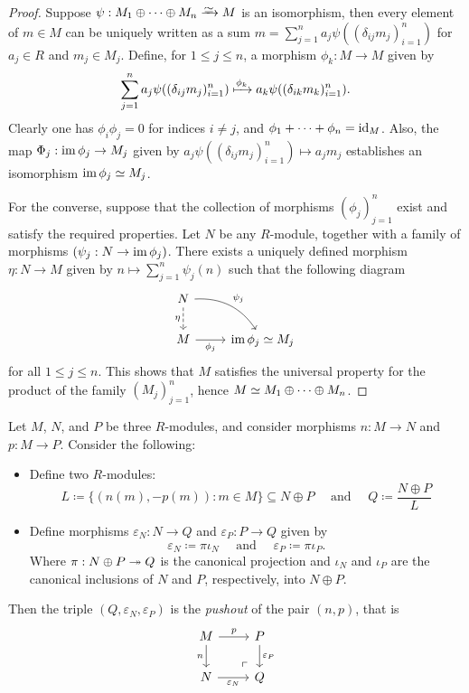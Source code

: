\begin{proof}
Suppose \(\psi: M_1 \oplus \dots \oplus M_n \isoto M\) is an isomorphism, then
every element of \(m \in M\) can be uniquely written as a sum
\(m = \sum_{j=1}^n a_j \psi((\delta_{ij} m_j)_{i=1}^n)\) for \(a_j \in R\) and
\(m_j \in M_j\). Define, for \(1 \leq j \leq n\), a morphism \(\phi_k: M \to M\)
given by
\[
\sum_{j=1}^n a_j \psi((\delta_{ij} m_j)_{i=1}^n)
\xmapsto{\phi_k} a_k \psi((\delta_{i k} m_k)_{i=1}^n).
\]
Clearly one has \(\phi_i \phi_j = 0\) for indices \(i \neq j\), and
\(\phi_1 + \dots + \phi_n = \operatorname{id}_M\). Also, the map
\(\Phi_j: \operatorname{im} \phi_j \to M_j\) given by
\(a_j \psi((\delta_{i j} m_j)_{i=1}^n) \mapsto a_j m_j\) establishes an
isomorphism \(\operatorname{im} \phi_j \simeq M_j\).

For the converse, suppose that the collection of morphisms \((\phi_j)_{j=1}^n\)
exist and satisfy the required properties. Let \(N\) be any \(R\)-module,
together with a family of morphisms \((\psi_j: N \to \operatorname{im} \phi_j)\). There
exists a uniquely defined morphism \(\eta: N \to M\) given by
\(n \mapsto \sum_{j=1}^n \psi_j(n)\) such that the following diagram
\[
\begin{tikzcd}
N \ar[d, "\eta"', dashed] \ar[rd, bend left, "\psi_j"] &\\
M \ar[r, "\phi_j"'] &\im \phi_j \iso M_j
\end{tikzcd}
\]
for all \(1 \leq j \leq n\). This shows that \(M\) satisfies the universal
property for the product of the family \((M_j)_{j=1}^n\), hence
\(M \simeq M_1 \oplus \dots \oplus M_n\).
\end{proof}

\begin{proposition}
\label{prop:pushout-modules}
Let \(M\), \(N\), and \(P\) be three \(R\)-modules, and consider morphisms \(n:
M \to N\) and \(p: M \to P\). Consider the following:
\begin{itemize}\setlength\itemsep{0em}
\item Define two \(R\)-modules:
  \[
  L \coloneq \{(n(m), -p(m)) \colon m \in M\} \subseteq N \oplus P
  \quad\text{ and } \quad
  Q \coloneq \frac{N \oplus P}{L}
  \]
\item Define morphisms \(\varepsilon_N: N \to Q\) and \(\varepsilon_P: P \to Q\)
  given by
  \[
  \varepsilon_N \coloneq \pi \iota_N \quad\text{ and }\quad
  \varepsilon_P \coloneq \pi \iota_P.
  \]
  Where \(\pi: N \oplus P \twoheadrightarrow Q\) is the canonical projection and \(\iota_N\)
  and \(\iota_P\) are the canonical inclusions of \(N\) and \(P\), respectively,
  into \(N \oplus P\).
\end{itemize}
Then the triple \((Q, \varepsilon_N, \varepsilon_P)\) is the \emph{pushout} of
the pair \((n, p)\), that is
\[
\begin{tikzcd}
M \ar[r, "p"] \ar[d, "n"'] \ar[rd, very near end, phantom, "\ulcorner"]
&P \ar[d, "\varepsilon_P"] \\
N \ar[r, "\varepsilon_N"'] &Q
\end{tikzcd}
\]
\end{proposition}

